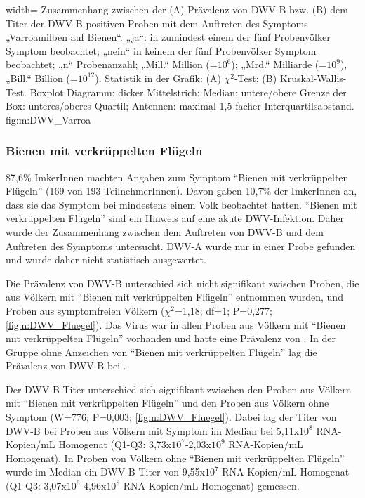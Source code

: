   {width=\textwidth} %
  {Zusammenhang zwischen der (A) Prävalenz von DWV-B bzw. (B) dem Titer der DWV-B positiven Proben mit dem Auftreten des Symptoms „Varroamilben auf Bienen“. „ja“: in zumindest einem der fünf Probenvölker Symptom beobachtet; „nein“ in keinem der fünf Probenvölker Symptom beobachtet; „n“ Probenanzahl; „Mill.“ Million (=$10^6$); „Mrd.“ Milliarde (=$10^9$), „Bill.“ Billion (=$10^{12}$). Statistik in der Grafik: (A) $\chi^2$-Test; (B) Kruskal-Wallis-Test. Boxplot Diagramm: dicker Mittelstrich: Median; untere/obere Grenze der Box: unteres/oberes Quartil; Antennen: maximal 1,5-facher Interquartilsabstand.} %
  {} %
  {fig:m:DWV_Varroa} %

\subsubsection{Bienen mit verkrüppelten Flügeln}

87,6\% ImkerInnen machten Angaben zum Symptom \enquote{Bienen mit verkrüppelten Flügeln} (169 von 193 TeilnehmerInnen). Davon gaben 10,7\% der ImkerInnen an, dass sie das Symptom bei mindestens einem Volk beobachtet hatten. \enquote{Bienen mit verkrüppelten Flügeln} sind ein Hinweis auf eine akute DWV-Infektion. Daher wurde der Zusammenhang zwischen dem Auftreten von DWV-B und dem Auftreten des Symptoms untersucht. DWV-A wurde nur in einer Probe gefunden und wurde daher nicht statistisch ausgewertet.

Die Prävalenz von DWV-B unterschied sich nicht signifikant zwischen Proben, die aus Völkern mit \enquote{Bienen mit verkrüppelten Flügeln} entnommen wurden, und Proben aus symptomfreien Völkern ($\chi^2$=1,18; df=1; P=0,277; \cref{fig:n:DWV_Fluegel}). Das Virus war in allen Proben aus Völkern mit \enquote{Bienen mit verkrüppelten Flügeln} vorhanden und hatte eine Prävalenz von . In der Gruppe ohne Anzeichen von \enquote{Bienen mit verkrüppelten Flügeln} lag die Prävalenz von DWV-B bei .

Der DWV-B Titer unterschied sich signifikant zwischen den Proben aus Völkern mit \enquote{Bienen mit verkrüppelten Flügeln} und den Proben aus Völkern ohne Symptom (W=776; P=0,003; \cref{fig:n:DWV_Fluegel}). Dabei lag der Titer von DWV-B bei Proben aus Völkern mit Symptom im Median bei 5,11x$10^8$ RNA-Kopien/\si{\milli\liter} Homogenat (Q1-Q3: 3,73x$10^7$-2,03x$10^9$ RNA-Kopien/\si{\milli\liter} Homogenat). In Proben von Völkern ohne \enquote{Bienen mit verkrüppelten Flügeln} wurde im Median ein DWV-B Titer von 9,55x$10^7$ RNA-Kopien/\si{\milli\liter} Homogenat (Q1-Q3: 3,07x$10^6$-4,96x$10^8$ RNA-Kopien/\si{\milli\liter} Homogenat) gemessen.

